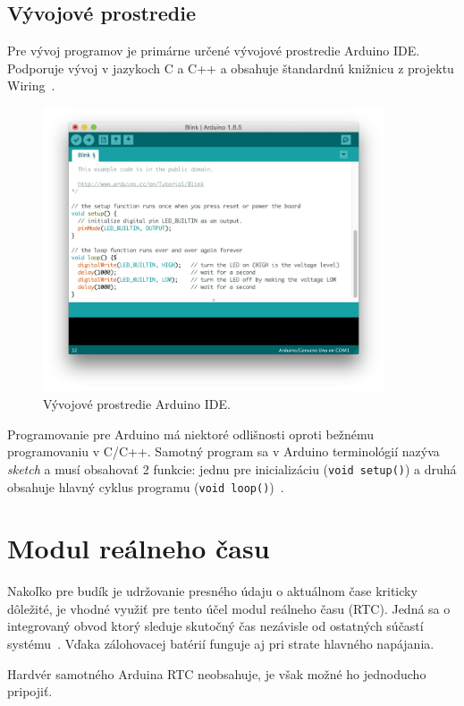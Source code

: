 \subsection{Vývojové prostredie}
Pre vývoj programov je primárne určené vývojové prostredie Arduino IDE. Podporuje vývoj v jazykoch C a C++ a obsahuje štandardnú knižnicu z projektu Wiring~\cite{maly-hvj}.

\begin{figure}
    \centering
    \includegraphics[width=0.9\textwidth]{img/Arduino_IDE.png}
    \caption{Vývojové prostredie Arduino IDE.}
\end{figure}

Programovanie pre Arduino má niektoré odlišnosti oproti bežnému programovaniu v C/C++. Samotný program sa v Arduino terminológií nazýva \emph{sketch} a musí obsahovať 2 funkcie: jednu pre inicializáciu (\texttt{void setup()}) a druhá obsahuje hlavný cyklus programu (\texttt{void loop()})~\cite{maly-hvj}.

\section{Modul reálneho času}
Nakoľko pre budík je udržovanie presného údaju o aktuálnom čase kriticky dôležité, je vhodné využiť pre tento účel modul reálneho času (RTC). Jedná sa o integrovaný obvod ktorý sleduje skutočný čas nezávisle od ostatných súčastí systému~\cite{rtc-adafruit}. Vďaka zálohovacej batérií funguje aj pri strate hlavného napájania.

Hardvér samotného Arduina RTC neobsahuje, je však možné ho jednoducho pripojiť.
